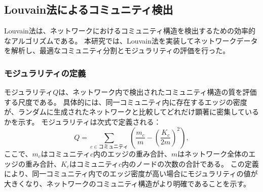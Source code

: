 \begin{table}[!ht]
    \centering
    \caption{タンパク質のノード数と、残基ペア間の最短距離が3\,\text{\AA}未満のエッジ数の中でhydrophobic相互作用を形成する残基ペアが占める割合}
    \label{tab:hydrophobic_rate}
  \end{table}


\subsection{Louvain法によるコミュニティ検出}

Louvain法は、ネットワークにおけるコミュニティ構造を検出するための効率的なアルゴリズムである。
本研究では、Louvain法\cite{Blondel2008}を実装してネットワークデータを解析し、最適なコミュニティ分割とモジュラリティの評価を行った。
\subsubsection{モジュラリティの定義}
モジュラリティ$Q$は、ネットワーク内で検出されたコミュニティ構造の質を評価する尺度である。
具体的には、同一コミュニティ内に存在するエッジの密度が、ランダムに生成されたネットワークと比較してどれだけ顕著に密集しているかを示す。
モジュラリティは次式で定義される：
\begin{equation}
Q = \sum_{c \in \text{コミュニティ}} \left( \frac{m_c}{m} - \left( \frac{K_c}{2m} \right)^2 \right),
\end{equation}
ここで、$m_c$はコミュニティ$c$内のエッジの重み合計、$m$はネットワーク全体のエッジの重み合計、$K_c$はコミュニティ$c$内のノードの次数の合計である。
この定義により、同一コミュニティ内でのエッジ密度が高い場合にモジュラリティの値が大きくなり、ネットワークのコミュニティ構造がより明確であることを示す。

